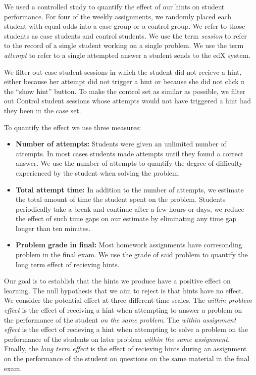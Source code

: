 \documentclass{llncs}
\begin{document}
We used a controlled study to quantify the effect of our hints on
student performance. For four of the weekly assignments, we randomly
placed each student with equal odds into a case group or a control
group. We refer to those students as case students and control
students.  We use the term {\em session} to refer to the record of a
single student working on a single problem. We use the term {\em
  attempt} to refer to a single attempted answer a student sends to
the edX system.

We filter out case student sessions in which the student did not
recieve a hint, either because her attempt did not trigger a hint or
because she did not click n the ``show hint'' button.  To make the
control set as similar as possible, we filter out Control student
sessions whose attempts would not have triggered a hint had they been
in the case set.

To quantify the effect we use three measures:
\begin{itemize}
\item {\bf Number of attempts:} Students were given an unlimited
  number of attempts. In most cases students made attempts until they
  found a correct answer. We use the number of attempts to quantify
  the degree of difficulty experienced by the student when solving the
  problem.
\item {\bf Total attempt time:} In addition to the number of attempts,
  we estimate the total amount of time the student spent on the
  problem. Students periodically take a break and continue
  after a few hours or days, we reduce the effect of such time gaps on
  our estimate by eliminating any time gap longer than ten
  minutes.
\item {\bf Problem grade in final:} Most homework assignments have
  corresonding problem in the final exam. We use the grade of said
  problem to quantify the long term effect of recieving hints. 
\end{itemize}

Our goal is to establish that the hints we produce have a positive
effect on learning. The null hypothesis that we aim to reject is that
hints have no effect. We consider the potential effect at three
different time scales. The {\em within problem effect} is the effect
of receiving a hint when attempting to answer a problem on the
performance of the student {\em on the same problem}. The {\em within
  assignment effect} is the effect of recieving a hint when attempting
to solve a problem on the performance of the students on later problem
{\em within the same assignment}. Finally, the {\em long term effect}
is the effect of recieving hints during an assignment on the
performance of the student on questions on the same material in the
final exam.
\end{document}
